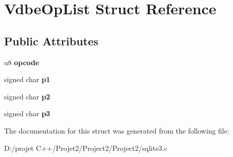 \hypertarget{struct_vdbe_op_list}{}\section{Vdbe\+Op\+List Struct Reference}
\label{struct_vdbe_op_list}
\subsection*{Public Attributes}
\begin{DoxyCompactItemize}
\item 
\mbox{\label{struct_vdbe_op_list_a9c839a619aed99f91cb5e226487be7be}} 
u8 {\bfseries opcode}
\item 
\mbox{\label{struct_vdbe_op_list_a68641ef4313dfdfafe45b75203c49d5a}} 
signed char {\bfseries p1}
\item 
\mbox{\label{struct_vdbe_op_list_a8493431402f7f91cea81c00e311dc4e1}} 
signed char {\bfseries p2}
\item 
\mbox{\label{struct_vdbe_op_list_a584cdaa02042fd5d1bc8cffbdfd9441d}} 
signed char {\bfseries p3}
\end{DoxyCompactItemize}


The documentation for this struct was generated from the following file\+:\begin{DoxyCompactItemize}
\item 
D\+:/projet C++/\+Projet2/\+Project2/\+Project2/sqlite3.\+c\end{DoxyCompactItemize}
